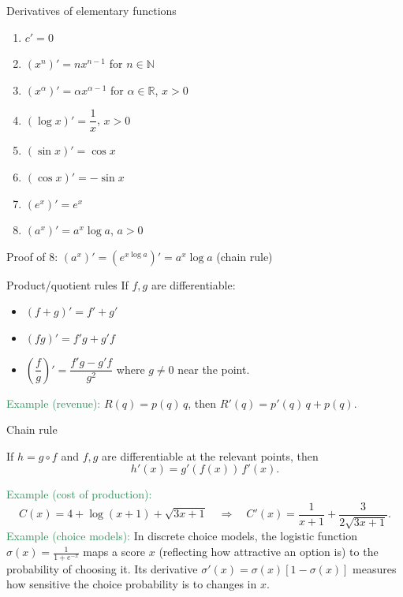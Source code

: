 \documentclass[10pt]{beamer}
\begin{document}
\begin{frame}{Derivatives of elementary functions}
\begin{enumerate}
\item $c' =0$
\item $(x^n)'=nx^{n-1}$ for $n\in\mathbb{N}$
\item $(x^\alpha)'=\alpha x^{\alpha-1}$ for $\alpha\in\mathbb{R}$, $x>0$
\item $(\log x)'=\dfrac{1}{x}$, $x>0$
\item $(\sin x)'=\cos x$
\item $(\cos x)'=-\sin x$
\item $(e^x)'=e^x$
\item $(a^x)'=a^x\log a$, $a>0$
\end{enumerate}
\begin{tiny}Proof of 8: $(a^x)'=(e^{x\log a})'=a^x\log a$ (chain rule)\end{tiny}
\end{frame}

\begin{frame}{Product/quotient rules}
If $f,g$ are differentiable:
\begin{itemize}
\item $(f+g)'=f'+g'$\\[4mm]
\item $(fg)'=f'g+g'f$ \quad {}\\[4mm]
\item $\left(\dfrac{f}{g}\right)'=\dfrac{f'g-g'f}{g^2}$ where $g\ne 0$ near the point.\\[7mm]
\end{itemize}
\smallskip
\textcolor{SeaGreen}{Example (revenue):} $R(q)=p(q)\,q$, then $R'(q)=p'(q)\,q+p(q)$.
\end{frame}

\begin{frame}{Chain rule}
\begin{alertblock}{}
If $h=g\circ f$ and $f,g$ are differentiable at the relevant points, then
\[
h'(x)=g'(f(x))\,f'(x).
\]
\end{alertblock}

\textcolor{SeaGreen}{Example (cost of production):}
\[
C(x)=4+\log(x+1)+\sqrt{3x+1}\quad\Rightarrow\quad
C'(x)=\frac{1}{x+1}+\frac{3}{2\sqrt{3x+1}}.
\]
\textcolor{SeaGreen}{Example (choice models):} In discrete choice models, the logistic function 
$\sigma(x)=\tfrac{1}{1+e^{-x}}$ maps a score $x$ (reflecting how attractive an option is) 
to the probability of choosing it. Its derivative $\sigma'(x)=\sigma(x)[1-\sigma(x)]$ 
measures how sensitive the choice probability is to changes in $x$.\end{frame}
\end{document}
